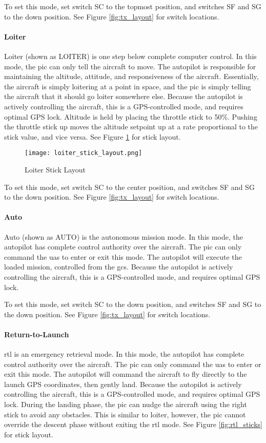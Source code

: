 \documentclass{report}
\begin{document}
					To set this mode, set switch SC to the topmost position, and switches SF and SG to the down position.  See Figure \ref{fig:tx_layout} for switch locations.
				\paragraph{Loiter}
					Loiter (shown as LOITER) is one step below complete computer control.  In this mode, the \gls{pic} can only tell the aircraft to move.  The autopilot is responsible for maintaining the altitude, attitude, and responsiveness of the aircraft.  Essentially, the aircraft is simply loitering at a point in space, and the \gls{pic} is simply telling the aircraft that it should go loiter somewhere else.  Because the autopilot is actively controlling the aircraft, this is a GPS-controlled mode, and requires optimal GPS lock.  Altitude is held by placing the throttle stick to 50\%.  Pushing the throttle stick up moves the altitude setpoint up at a rate proportional to the stick value, and vice versa.  See Figure \ref{fig:loiter_sticks} for stick layout.

					\begin{figure}[ht]
						\centering
						\caption{Loiter Stick Layout}
						\texttt{[image: loiter\_stick\_layout.png]}
						\label{fig:loiter_sticks}
					\end{figure}

					To set this mode, set switch SC to the center position, and switches SF and SG to the down position.  See Figure \ref{fig:tx_layout} for switch locations.
				\paragraph{Auto}
					Auto (shown as AUTO) is the autonomous mission mode.  In this mode, the autopilot has complete control authority over the aircraft.  The \gls{pic} can only command the \gls{uas} to enter or exit this mode.  The autopilot will execute the loaded mission, controlled from the \gls{gcs}.  Because the autopilot is actively controlling the aircraft, this is a GPS-controlled mode, and requires optimal GPS lock.

					To set this mode, set switch SC to the down position, and switches SF and SG to the down position.  See Figure \ref{fig:tx_layout} for switch locations.
				\paragraph{Return-to-Launch}
					\gls{rtl} is an emergency retrieval mode.  In this mode, the autopilot has complete control authority over the aircraft.  The \gls{pic} can only command the \gls{uas} to enter or exit this mode.  The autopilot will command the aircraft to fly directly to the launch GPS coordinates, then gently land.  Because the autopilot is actively controlling the aircraft, this is a GPS-controlled mode, and requires optimal GPS lock.  During the landing phase, the \gls{pic} can nudge the aircraft using the right stick to avoid any obstacles.  This is similar to loiter, however, the \gls{pic} cannot override the descent phase without exiting the \gls{rtl} mode.  See Figure \ref{fig:rtl_sticks} for stick layout.
\end{document}
